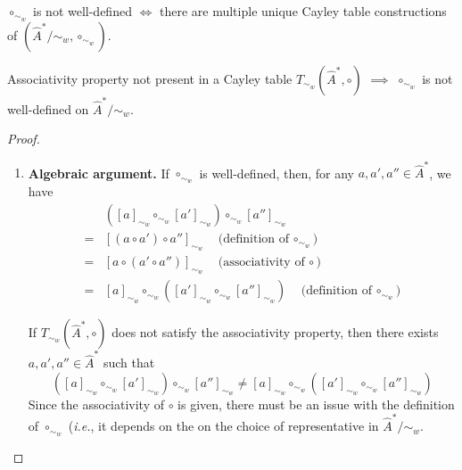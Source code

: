 \begin{corollary}
    $\circ_{\sim_{w}}$ is not well-defined $\iff$ there are multiple unique Cayley table constructions of $(\hat{A}^{*}/\sim_{w}, \circ_{\sim_{w}})$.
\end{corollary}


\begin{proposition}
    Associativity property not present in a Cayley table $T_{\sim_{w}}(\hat{A}^{*}, \circ)$ $\implies$ $\circ_{\sim_{w}}$ is not well-defined on $\hat{A}^{*}/\sim_{w}$.
\end{proposition}
\begin{proof}
\begin{enumerate}[(1)]
    \item \textbf{Algebraic argument.}
    If $\circ_{\sim_{w}}$ is well-defined, then, for any $a, a', a'' \in \hat{A}^{*}$, we have
    \begin{align}
          & ([a]_{\sim_{w}} \circ_{\sim_{w}} [a']_{\sim_{w}}) \circ_{\sim_{w}} [a'']_{\sim_{w}} \\
        = & [(a \circ a') \circ a'']_{\sim_{w}} \quad \text{(definition of $\circ_{\sim_{w}}$}) \\
        = & [a \circ (a' \circ a'')]_{\sim_{w}} \quad \text{(associativity of $\circ$}) \\
        = & [a]_{\sim_{w}} \circ_{\sim_{w}} ([a']_{\sim_{w}} \circ_{\sim_{w}} [a'']_{\sim_{w}}) \quad \text{(definition of $\circ_{\sim_{w}}$})
    \end{align}

    If $T_{\sim_{w}}(\hat{A}^{*}, \circ)$ does not satisfy the associativity property, then there exists $a, a', a'' \in \hat{A}^{*}$ such that
    \begin{equation}
        ([a]_{\sim_{w}} \circ_{\sim_{w}} [a']_{\sim_{w}}) \circ_{\sim_{w}} [a'']_{\sim_{w}} \neq [a]_{\sim_{w}} \circ_{\sim_{w}} ([a']_{\sim_{w}} \circ_{\sim_{w}} [a'']_{\sim_{w}})
    \end{equation}
    Since the associativity of $\circ$ is given, there must be an issue with the definition of $\circ_{\sim_{w}}$ (\textit{i.e.}, it depends on the on the choice of representative in $\hat{A}^{*}/\sim_{w}$.
    

\end{enumerate}
\end{proof}
